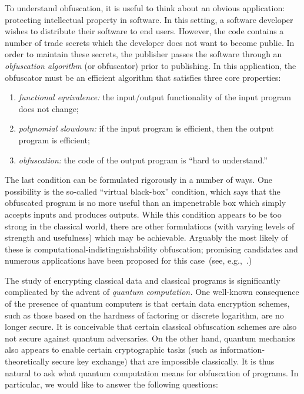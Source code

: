 \documentclass[envcountsame]{llncs}
\numberwithin{equation}{section}
\begin{document}
To understand obfuscation, it is useful to think about an obvious application: protecting intellectual property in software. In this setting, a software developer wishes to distribute their software to end users. However, the code contains a number of trade secrets which the developer does not want to become public. In order to maintain these secrets, the publisher passes the software through an \emph{obfuscation algorithm} (or obfuscator) prior to publishing. In this application, the obfuscator must be an efficient algorithm that satisfies three core properties: 
\begin{enumerate}\label{def:obf-informal}
\item \emph{functional equivalence:} the input/output functionality of the input program does not change;
\item \emph{polynomial slowdown:} if the input program is efficient, then the output program is efficient;
\item \emph{obfuscation:} the code of the output program is ``hard to understand.''
\end{enumerate}
The last condition can be formulated rigorously in a number of ways. One possibility is the so-called ``virtual black-box'' condition, which says that the obfuscated program is no more useful than an impenetrable box which simply accepts inputs and produces outputs. While this condition appears to be too strong in the classical world, there are other formulations (with varying levels of strength and usefulness) which may be achievable. Arguably the most likely of these is computational-indistinguishability obfuscation; promising candidates and numerous applications have been proposed for this case~(see, e.g.,~\cite{GGHRSW13, BGKPS14, BCCGKPR14, BZ14, BR14, GGHW14, HSW14}.)

The study of encrypting classical data and classical programs is significantly complicated by the advent of \emph{quantum computation.} One well-known consequence of the presence of quantum computers is that certain data encryption schemes, such as those based on the hardness of factoring or discrete logarithm, are no longer secure. It is conceivable that certain classical obfuscation schemes are also not secure against quantum adversaries. On the other hand, quantum mechanics also appears to enable certain cryptographic tasks (such as information-theoretically secure key exchange) that are impossible classically. It is thus natural to ask what quantum computation means for obfuscation of programs. In particular, we would like to answer the following questions:
\end{document}
